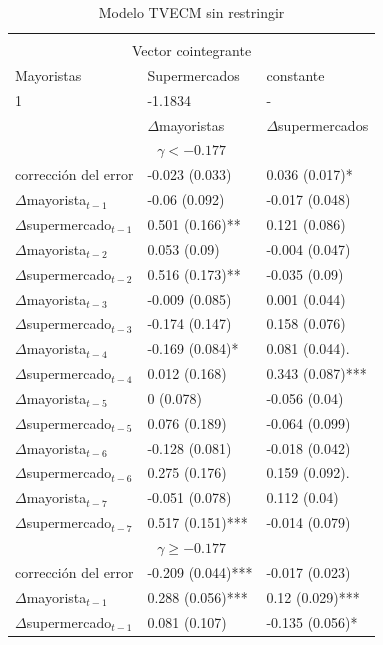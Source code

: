 \begin{table}[H]
\centering
\caption{Modelo TVECM sin restringir}
\begin{tabular}{@{}lll@{}}
\toprule \\
\multicolumn{3}{c}{Vector cointegrante} \\
\midrule 
Mayoristas & Supermercados & constante \\ 
1             & -1.1834 & - \\
\midrule
 & $\Delta$mayoristas & $\Delta$supermercados \\ 
\midrule 
\multicolumn{3}{c}{$\gamma<-0.177$} \\
\midrule 
corrección del error & -0.023 (0.033) &0.036 (0.017)* \\
$\Delta$mayorista$_{t -1}$ & -0.06 (0.092) &-0.017 (0.048) \\
$\Delta$supermercado$_{t -1}$ & 0.501 (0.166)** &0.121 (0.086) \\
$\Delta$mayorista$_{t -2}$ & 0.053 (0.09) &-0.004 (0.047) \\
$\Delta$supermercado$_{t -2}$ & 0.516 (0.173)** &-0.035 (0.09) \\
$\Delta$mayorista$_{t -3}$ & -0.009 (0.085) &0.001 (0.044) \\
$\Delta$supermercado$_{t -3}$ & -0.174 (0.147) &0.158 (0.076) \\
$\Delta$mayorista$_{t -4}$ & -0.169 (0.084)* &0.081 (0.044). \\
$\Delta$supermercado$_{t -4}$ & 0.012 (0.168) &0.343 (0.087)*** \\
$\Delta$mayorista$_{t -5}$ & 0 (0.078) &-0.056 (0.04) \\
$\Delta$supermercado$_{t -5}$ & 0.076 (0.189) &-0.064 (0.099) \\
$\Delta$mayorista$_{t -6}$ & -0.128 (0.081) &-0.018 (0.042) \\
$\Delta$supermercado$_{t -6}$ & 0.275 (0.176) &0.159 (0.092). \\
$\Delta$mayorista$_{t -7}$ & -0.051 (0.078) &0.112 (0.04) \\
$\Delta$supermercado$_{t -7}$ & 0.517 (0.151)*** &-0.014 (0.079) \\
\midrule 
\multicolumn{3}{c}{$\gamma\geq -0.177$} \\
\midrule 
corrección del error & -0.209 (0.044)*** &-0.017 (0.023) \\
$\Delta$mayorista$_{t -1}$ & 0.288 (0.056)*** &0.12 (0.029)*** \\
$\Delta$supermercado$_{t -1}$ & 0.081 (0.107) &-0.135 (0.056)* \\

\end{tabular}
\end{table}
